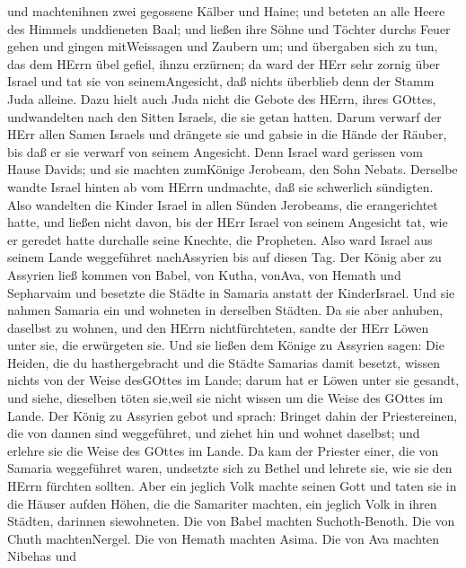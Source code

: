 und machtenihnen zwei gegossene Kälber und Haine; und beteten an alle
Heere des Himmels unddieneten Baal;  und ließen ihre Söhne
und Töchter durchs Feuer gehen und gingen mitWeissagen und Zaubern um;
und übergaben sich zu tun, das dem HErrn übel gefiel, ihnzu erzürnen;
 da ward der HErr sehr zornig über Israel und tat sie von
seinemAngesicht, daß nichts überblieb denn der Stamm Juda alleine.
 Dazu hielt auch Juda nicht die Gebote des HErrn, ihres
GOttes, undwandelten nach den Sitten Israels, die sie getan hatten.
 Darum verwarf der HErr allen Samen Israels und drängete
sie und gabsie in die Hände der Räuber, bis daß er sie verwarf von
seinem Angesicht.  Denn Israel ward gerissen vom Hause
Davids; und sie machten zumKönige Jerobeam, den Sohn Nebats. Derselbe
wandte Israel hinten ab vom HErrn undmachte, daß sie schwerlich
sündigten.  Also wandelten die Kinder Israel in allen
Sünden Jerobeams, die erangerichtet hatte, und ließen nicht davon,
 bis der HErr Israel von seinem Angesicht tat, wie er
geredet hatte durchalle seine Knechte, die Propheten. Also ward Israel
aus seinem Lande weggeführet nachAssyrien bis auf diesen Tag.
 Der König aber zu Assyrien ließ kommen von Babel, von
Kutha, vonAva, von Hemath und Sepharvaim und besetzte die Städte in
Samaria anstatt der KinderIsrael. Und sie nahmen Samaria ein und
wohneten in derselben Städten.  Da sie aber anhuben,
daselbst zu wohnen, und den HErrn nichtfürchteten, sandte der HErr Löwen
unter sie, die erwürgeten sie.  Und sie ließen dem Könige
zu Assyrien sagen: Die Heiden, die du hasthergebracht und die Städte
Samarias damit besetzt, wissen nichts von der Weise desGOttes im Lande;
darum hat er Löwen unter sie gesandt, und siehe, dieselben töten
sie,weil sie nicht wissen um die Weise des GOttes im Lande.
 Der König zu Assyrien gebot und sprach: Bringet dahin der
Priestereinen, die von dannen sind weggeführet, und ziehet hin und
wohnet daselbst; und erlehre sie die Weise des GOttes im Lande.
 Da kam der Priester einer, die von Samaria weggeführet
waren, undsetzte sich zu Bethel und lehrete sie, wie sie den HErrn
fürchten sollten.  Aber ein jeglich Volk machte seinen Gott
und taten sie in die Häuser aufden Höhen, die die Samariter machten, ein
jeglich Volk in ihren Städten, darinnen siewohneten.  Die
von Babel machten Suchoth-Benoth. Die von Chuth machtenNergel. Die von
Hemath machten Asima.  Die von Ava machten Nibehas und
